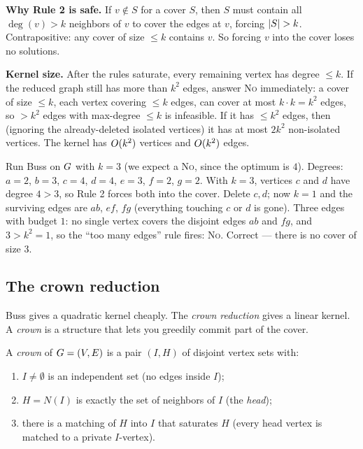 \begin{whybox}
\textbf{Why Rule 2 is safe.} If $v\notin S$ for a cover $S$, then $S$ must contain all $\deg(v)>k$ neighbors of $v$ to cover the edges at $v$, forcing $\lvert S\rvert>k$. Contrapositive: any cover of size $\le k$ contains $v$. So forcing $v$ into the cover loses no solutions.

\textbf{Kernel size.} After the rules saturate, every remaining vertex has degree $\le k$. If the reduced graph still has more than $k^2$ edges, answer \textsc{No} immediately: a cover of size $\le k$, each vertex covering $\le k$ edges, can cover at most $k\cdot k=k^2$ edges, so $>k^2$ edges with max-degree $\le k$ is infeasible. If it has $\le k^2$ edges, then (ignoring the already-deleted isolated vertices) it has at most $2k^2$ non-isolated vertices. The kernel has $O(k^2)$ vertices and $O(k^2)$ edges.
\end{whybox}

\begin{labbox}
Run Buss on $G$ with $k=3$ (we expect a \textsc{No}, since the optimum is $4$). Degrees: $a{=}2$, $b{=}3$, $c{=}4$, $d{=}4$, $e{=}3$, $f{=}2$, $g{=}2$. With $k=3$, vertices $c$ and $d$ have degree $4>3$, so Rule 2 forces both into the cover. Delete $c,d$; now $k=1$ and the surviving edges are $ab$, $ef$, $fg$ (everything touching $c$ or $d$ is gone). Three edges with budget $1$: no single vertex covers the disjoint edges $ab$ and $fg$, and $3 > k^2 = 1$, so the ``too many edges'' rule fires: \textsc{No}. Correct --- there is no cover of size $3$.
\end{labbox}

\subsection{The crown reduction}

Buss gives a quadratic kernel cheaply. The \emph{crown reduction} gives a linear kernel. A \emph{crown} is a structure that lets you greedily commit part of the cover.

\begin{definition}[Crown]\label{ch25:def-crown}
A \emph{crown} of $G=(V,E)$ is a pair $(I,H)$ of disjoint vertex sets with:
\begin{enumerate}
  \item $I\neq\emptyset$ is an independent set (no edges inside $I$);
  \item $H = N(I)$ is exactly the set of neighbors of $I$ (the \emph{head});
  \item there is a matching of $H$ into $I$ that saturates $H$ (every head vertex is matched to a private $I$-vertex).
\end{enumerate}
\end{definition}

